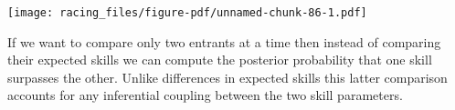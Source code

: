 \documentclass[
  letterpaper,
  DIV=11,
  numbers=noendperiod]{scrartcl}
\newenvironment{Shaded}{\begin{snugshade}}{\end{snugshade}}
\newcommand{\AttributeTok}[1]{\textcolor[rgb]{0.40,0.45,0.13}{#1}}
\newcommand{\ConstantTok}[1]{\textcolor[rgb]{0.56,0.35,0.01}{#1}}
\newcommand{\DecValTok}[1]{\textcolor[rgb]{0.68,0.00,0.00}{#1}}
\newcommand{\FloatTok}[1]{\textcolor[rgb]{0.68,0.00,0.00}{#1}}
\newcommand{\FunctionTok}[1]{\textcolor[rgb]{0.28,0.35,0.67}{#1}}
\newcommand{\NormalTok}[1]{\textcolor[rgb]{0.00,0.23,0.31}{#1}}
\newcommand{\OtherTok}[1]{\textcolor[rgb]{0.00,0.23,0.31}{#1}}
\newcommand{\SpecialCharTok}[1]{\textcolor[rgb]{0.37,0.37,0.37}{#1}}
\newcommand{\StringTok}[1]{\textcolor[rgb]{0.13,0.47,0.30}{#1}}
\begin{document}
\begin{Shaded}
\end{Shaded}

\texttt{[image: racing\_files/figure-pdf/unnamed-chunk-86-1.pdf]}

If we want to compare only two entrants at a time then instead of
comparing their expected skills we can compute the posterior probability
that one skill surpasses the other. Unlike differences in expected
skills this latter comparison accounts for any inferential coupling
between the two skill parameters.
\end{document}
